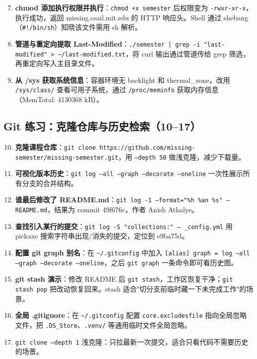 \documentclass[12pt,a4paper]{article}
\begin{document}
\begin{enumerate}
    \setcounter{enumi}{6}
    \item \textbf{chmod 添加执行权限并执行}：\texttt{chmod +x semester} 后权限变为 \texttt{-rwxr-xr-x}，执行成功，返回 missing.csail.mit.edu 的 HTTP 响应头。Shell 通过 shebang（\texttt{\#!/bin/sh}）知晓该文件需用 sh 解析。
    \item \textbf{管道与重定向提取 Last-Modified}：\texttt{./semester | grep -i "last-modified" > \textasciitilde/last-modified.txt}，将 curl 输出通过管道传给 grep 筛选，再重定向写入主目录文件。
    \item \textbf{从 /sys 获取系统信息}：容器环境无 backlight 和 thermal\_zone，改用 \texttt{/sys/class/} 查看可用子系统，通过 \texttt{/proc/meminfo} 获取内存信息（MemTotal: 4130368 kB）。
\end{enumerate}

\subsection{Git 练习：克隆仓库与历史检索（10--17）}

\begin{enumerate}
    \setcounter{enumi}{9}
    \item \textbf{克隆课程仓库}：\texttt{git clone https://github.com/missing-semester/missing-semester.git}，用 \texttt{--depth 50} 做浅克隆，减少下载量。
    \item \textbf{可视化版本历史}：\texttt{git log --all --graph --decorate --oneline} 一次性展示所有分支的合并结构。
    \item \textbf{谁最后修改了 README.md}：\texttt{git log -1 --format="\%h \%an \%s" -- README.md}，结果为 commit 49f676c，作者 Anish Athalye。
    \item \textbf{查找引入某行的提交}：\texttt{git log -S "collections:" -- \_config.yml} 用 pickaxe 搜索字符串出现/消失的提交，定位到 e9ba75d。
    \item \textbf{配置 git graph 别名}：在 \texttt{\textasciitilde/.gitconfig} 中加入 \texttt{[alias] graph = log --all --graph --decorate --oneline}，之后 \texttt{git graph} 一条命令即可看历史图。
    \item \textbf{git stash 演示}：修改 README 后 \texttt{git stash}，工作区恢复干净；\texttt{git stash pop} 把改动恢复回来。stash 适合"切分支前临时藏一下未完成工作"的场景。
    \item \textbf{全局 .gitignore}：在 \texttt{\textasciitilde/.gitconfig} 配置 \texttt{core.excludesfile} 指向全局忽略文件，把 \texttt{.DS\_Store}、\texttt{.venv/} 等通用临时文件全局忽略。
    \item \texttt{git clone --depth 1} 浅克隆：只拉最新一次提交，适合只看代码不需要历史的场景。
\end{enumerate}
\end{document}
